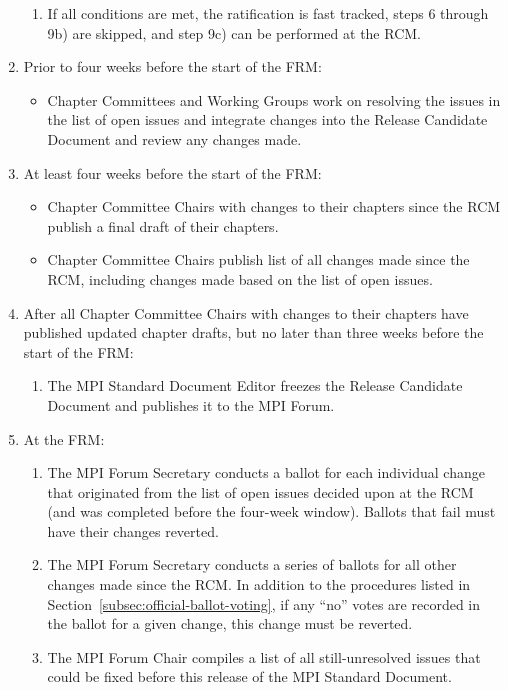 \begin{enumerate}
\begin{enumerate}
    \item If all conditions are met, the ratification is fast tracked,
      steps 6 through 9b) are skipped, and step 9c) can be performed
      at the RCM.
  \end{enumerate}

\item Prior to four weeks before the start of the FRM:
  \label{subsec:official-ballot-voting:t-4weeks-frm}
  \begin{itemize}
  \item Chapter Committees and Working Groups work on resolving the
    issues in the list of open issues and integrate changes into the
    Release Candidate Document and review any changes made.
  \end{itemize}

\item At least four weeks before the start of the FRM:
  \begin{itemize}
  \item Chapter Committee Chairs with changes to their chapters since
    the RCM publish a final draft of their chapters.
  \item Chapter Committee Chairs publish list of all changes made
    since the RCM, including changes made based on the list of open
    issues.
  \end{itemize}

\item After all Chapter Committee Chairs with changes to their
  chapters have published updated chapter drafts, but no later than
  three weeks before the start of the FRM:
  \begin{enumerate}
  \item The MPI Standard Document Editor freezes the Release Candidate
    Document and publishes it to the MPI Forum.
  \end{enumerate}

\item At the FRM:
  \begin{enumerate}
  \item The MPI Forum Secretary conducts a ballot for each individual
    change that originated from the list of open issues decided upon
    at the RCM (and was completed before the four-week window).
    Ballots that fail must have their changes reverted.
  \item The MPI Forum Secretary conducts a series of ballots for all
    other changes made since the RCM.  In addition to the procedures
    listed in Section~\ref{subsec:official-ballot-voting}, if any
    ``no'' votes are recorded in the ballot for a given change, this
    change must be reverted.
  \item The MPI Forum Chair compiles a list of all still-unresolved
    issues that could be fixed before this release of the MPI
    Standard Document.


\end{enumerate}
\end{enumerate}
